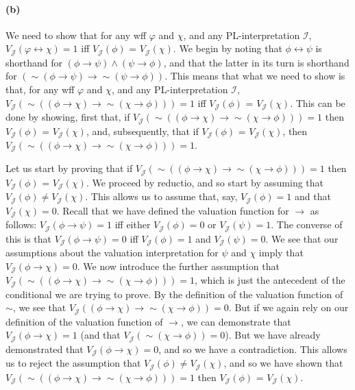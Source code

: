 \documentclass[sloppy, journal, git, bytitle]{humapap}
\begin{document}
\paragraph{(b)} We need to show that for any wff $\varphi$ and $\chi$, and any PL-interpretation $\mathcal{I}$, $V\mathcal{_J}(\varphi\leftrightarrow\chi)=1$ iff $V\mathcal{_J}(\phi)$ = $V\mathcal{_J}(\chi)$. We begin by noting that $\phi\leftrightarrow\psi$ is shorthand for $(\phi\rightarrow\psi)\wedge(\psi\rightarrow\phi)$, and that the latter in its turn is shorthand for $(\sim(\phi\rightarrow\psi)\rightarrow\sim(\psi\rightarrow\phi))$.  
This means that what we need to show is that, for any wff $\varphi$ and $\chi$, and any PL-interpretation $\mathcal{I}$, $V\mathcal{_J}(\sim((\phi\rightarrow\chi)\rightarrow\sim(\chi\rightarrow\phi)))=1$ iff $V\mathcal{_J}(\phi)$ = $V\mathcal{_J}(\chi)$. This can be done by showing, first that, if $V\mathcal{_J}(\sim((\phi\rightarrow\chi)\rightarrow\sim(\chi\rightarrow\phi)))=1$ then $V\mathcal{_J}(\phi)$ = $V\mathcal{_J}(\chi)$, and, subsequently, that if $V\mathcal{_J}(\phi)$ = $V\mathcal{_J}(\chi)$, then $V\mathcal{_J}(\sim((\phi\rightarrow\chi)\rightarrow\sim(\chi\rightarrow\phi)))=1$. 

Let us start by proving that if $V\mathcal{_J}(\sim((\phi\rightarrow\chi)\rightarrow\sim(\chi\rightarrow\phi)))=1$ then $V\mathcal{_J}(\phi)$ = $V\mathcal{_J}(\chi)$. We proceed by reductio, and so start by assuming that $V\mathcal{_J}(\phi) \neq  V\mathcal{_J}(\chi)$. This allows us to assume that, say, $V\mathcal{_J}(\phi)=1$ and that $V\mathcal{_J}(\chi)=0$. Recall that we have defined the valuation function for $\rightarrow$ as follows: $V\mathcal{_J}(\phi\rightarrow\psi)=1$ iff either $V\mathcal{_J}(\phi)=0$ or $V\mathcal{_J}(\psi)=1$. The converse of this is that $V\mathcal{_J}(\phi\rightarrow\psi)=0$ iff $V\mathcal{_J}(\phi)=1$ and $V\mathcal{_J}(\psi)=0$. We see that our assumptions about the valuation interpretation for $\psi$ and $\chi$ imply that $V\mathcal{_J}(\phi\rightarrow\chi)=0$. We now introduce the further assumption that $V\mathcal{_J}(\sim((\phi\rightarrow\chi)\rightarrow\sim(\chi\rightarrow\phi)))=1$, which is just the antecedent of the conditional we are trying to prove. By the definition of the valuation function of $\sim$, we see that $V\mathcal{_J}((\phi\rightarrow\chi)\rightarrow\sim(\chi\rightarrow\phi))=0$. But if we again rely on our definition of the valuation function of $\rightarrow$, we can demonstrate that $V\mathcal{_J}(\phi\rightarrow\chi)=1$ (and that $V\mathcal{_J}(\sim(\chi\rightarrow\phi))=0$). But we have already demonstrated that $V\mathcal{_J}(\phi\rightarrow\chi)=0$, and so we have a contradiction. This allows us to reject the assumption that $V\mathcal{_J}(\phi) \neq  V\mathcal{_J}(\chi)$, and so we have shown that $V\mathcal{_J}(\sim((\phi\rightarrow\chi)\rightarrow\sim(\chi\rightarrow\phi)))=1$ then $V\mathcal{_J}(\phi)$ = $V\mathcal{_J}(\chi)$.
\end{document}
